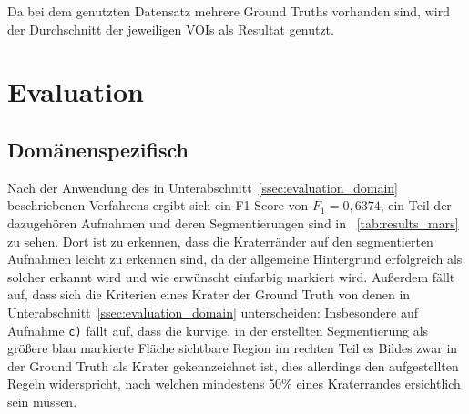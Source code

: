 Da bei dem genutzten Datensatz mehrere Ground Truths vorhanden sind, wird der Durchschnitt der jeweiligen VOIs als Resultat genutzt.



\section{Evaluation}
\label{sec:evaluation}

\subsection{Domänenspezifisch}
\label{ssec:results_domain}

Nach der Anwendung des in Unterabschnitt~\ref{ssec:evaluation_domain} beschriebenen Verfahrens ergibt sich ein F1-Score von $F_1=0,6374$, ein Teil der dazugehören Aufnahmen und deren Segmentierungen sind in \tablename~\ref{tab:results_mars} zu sehen.
Dort ist zu erkennen, dass die Kraterränder auf den segmentierten Aufnahmen leicht zu erkennen sind, da der allgemeine Hintergrund erfolgreich als solcher erkannt wird und wie erwünscht einfarbig markiert wird. Außerdem fällt auf, dass sich die Kriterien eines Krater der Ground Truth von denen in Unterabschnitt~\ref{ssec:evaluation_domain} unterscheiden: Insbesondere auf Aufnahme \texttt{c)} fällt auf, dass \bspw die kurvige, in der erstellten Segmentierung als größere blau markierte Fläche sichtbare Region im rechten Teil es Bildes zwar in der Ground Truth als Krater gekennzeichnet ist, dies allerdings den aufgestellten Regeln widerspricht, nach welchen mindestens 50\% eines Kraterrandes ersichtlich sein müssen.

